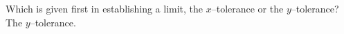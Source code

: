 {Which is given first in establishing a limit, the $x$--tolerance or the $y$--tolerance?}
{The $y$--tolerance.}
